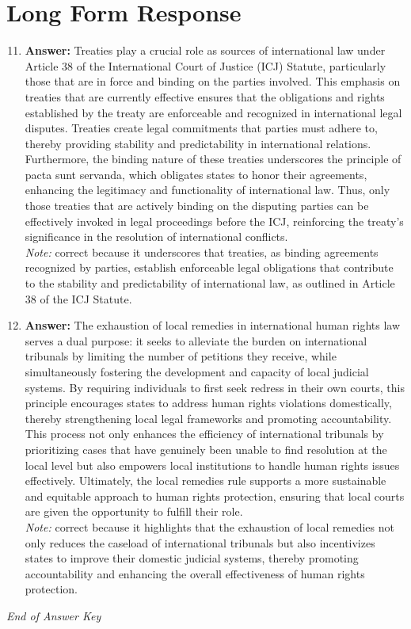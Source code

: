 \documentclass[12pt]{article}
\begin{document}
\section*{Long Form Response}
\begin{enumerate}[label=\arabic*.]
\setcounter{enumi}{10}
\item \textbf{Answer:} Treaties play a crucial role as sources of international law under Article 38 of the International Court of Justice (ICJ) Statute, particularly those that are in force and binding on the parties involved. This emphasis on treaties that are currently effective ensures that the obligations and rights established by the treaty are enforceable and recognized in international legal disputes. Treaties create legal commitments that parties must adhere to, thereby providing stability and predictability in international relations. Furthermore, the binding nature of these treaties underscores the principle of pacta sunt servanda, which obligates states to honor their agreements, enhancing the legitimacy and functionality of international law. Thus, only those treaties that are actively binding on the disputing parties can be effectively invoked in legal proceedings before the ICJ, reinforcing the treaty's significance in the resolution of international conflicts.
\\ \textit{Note:} correct because it underscores that treaties, as binding agreements recognized by parties, establish enforceable legal obligations that contribute to the stability and predictability of international law, as outlined in Article 38 of the ICJ Statute.
\item \textbf{Answer:} The exhaustion of local remedies in international human rights law serves a dual purpose: it seeks to alleviate the burden on international tribunals by limiting the number of petitions they receive, while simultaneously fostering the development and capacity of local judicial systems. By requiring individuals to first seek redress in their own courts, this principle encourages states to address human rights violations domestically, thereby strengthening local legal frameworks and promoting accountability. This process not only enhances the efficiency of international tribunals by prioritizing cases that have genuinely been unable to find resolution at the local level but also empowers local institutions to handle human rights issues effectively. Ultimately, the local remedies rule supports a more sustainable and equitable approach to human rights protection, ensuring that local courts are given the opportunity to fulfill their role.
\\ \textit{Note:} correct because it highlights that the exhaustion of local remedies not only reduces the caseload of international tribunals but also incentivizes states to improve their domestic judicial systems, thereby promoting accountability and enhancing the overall effectiveness of human rights protection.
\end{enumerate}

\vfill
\noindent\textit{End of Answer Key}
\end{document}
